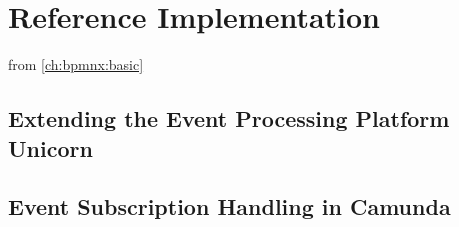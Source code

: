 \chapter{Reference Implementation}\label{ch:implementation}

from \autoref{ch:bpmnx:basic}

\section{Extending the Event Processing Platform Unicorn}\label{ch:implunicorn}

\section{Event Subscription Handling in Camunda}\label{ch:implcamunda}